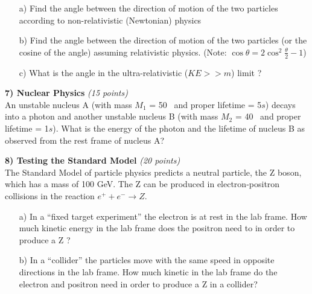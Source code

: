 {\begin{itemize}
\item[a)]Find the angle between the direction of motion of the two particles according to non-relativistic (Newtonian) physics 

\vspace{3.in}

\item[b)]Find the angle between the direction of motion of the two particles (or the cosine of the angle) assuming relativistic physics. (Note: $\cos \theta = 2 \cos^2 \frac{\theta}{2} - 1$)

\vspace{3in}

\item[c)]What is the angle in the ultra-relativistic  ($KE >> m$) limit ? 

\end{itemize}



\clearpage



\textbf{7) Nuclear Physics }\hfill \textit{(15 points)}\\

An unstable nucleus A (with mass $M_1$ = 50 \GeV\ and proper lifetime = 5$s$) decays into a photon and another unstable nucleus B (with mass $M_2$ = 40 \GeV\ and proper lifetime = 1$s$).
What is the energy of the photon and the lifetime of nucleus B as observed from the rest frame of nucleus A?


\clearpage
\textbf{8) Testing the Standard Model }\hfill \textit{(20 points)}\\
The Standard Model of particle physics predicts a neutral particle, the Z boson, which has a mass of 100 GeV.
The Z can be produced in electron-positron collisions in the reaction $e^+ + e^- \rightarrow Z$.

\begin{itemize}
\item[a)]In a ``fixed target experiment'' the electron is at rest in the lab frame. 
How much kinetic energy in the lab frame does the positron need to in order to produce a Z ?

\vspace{3.75in}

\item[b)] In a ``collider'' the particles move with the same speed in opposite directions in the lab frame.
How much kinetic in the lab frame do the electron and positron need in order to produce a Z in a collider?
\end{itemize}


} %

